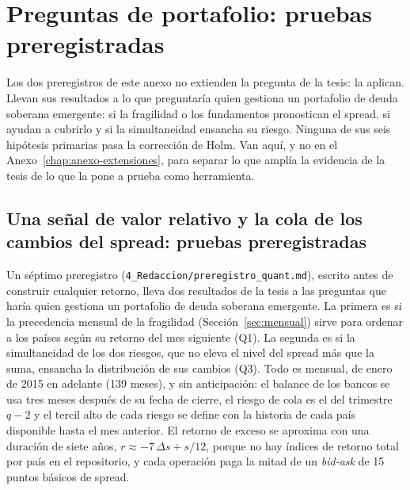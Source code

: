 \chapter{Preguntas de portafolio: pruebas preregistradas}
\label{chap:anexo-portafolio}

Los dos preregistros de este anexo no extienden la pregunta de la tesis: la aplican. Llevan sus resultados a lo que preguntaría quien gestiona un portafolio de deuda soberana emergente: si la fragilidad o los fundamentos pronostican el spread, si ayudan a cubrirlo y si la simultaneidad ensancha su riesgo. Ninguna de sus seis hipótesis primarias pasa la corrección de Holm. Van aquí, y no en el Anexo~\ref{chap:anexo-extensiones}, para separar lo que amplía la evidencia de la tesis de lo que la pone a prueba como herramienta.

\section{Una señal de valor relativo y la cola de los cambios del spread: pruebas preregistradas}
\label{sec:quant-prereg}

Un séptimo preregistro (\texttt{4\_Redaccion/preregistro\_quant.md}), escrito antes de construir cualquier retorno, lleva dos resultados de la tesis a las preguntas que haría quien gestiona un portafolio de deuda soberana emergente. La primera es si la precedencia mensual de la fragilidad (Sección~\ref{sec:mensual}) sirve para ordenar a los países según su retorno del mes siguiente (Q1). La segunda es si la simultaneidad de los dos riesgos, que no eleva el nivel del spread más que la suma, ensancha la distribución de sus cambios (Q3). Todo es mensual, de enero de 2015 en adelante (139 meses), y sin anticipación: el balance de los bancos se usa tres meses después de su fecha de cierre, el riesgo de cola es el del trimestre $q-2$ y el tercil alto de cada riesgo se define con la historia de cada país disponible hasta el mes anterior. El retorno de exceso se aproxima con una duración de siete años, $r\approx-7\,\Delta s+s/12$, porque no hay índices de retorno total por país en el repositorio, y cada operación paga la mitad de un \textit{bid-ask} de 15 puntos básicos de spread.

